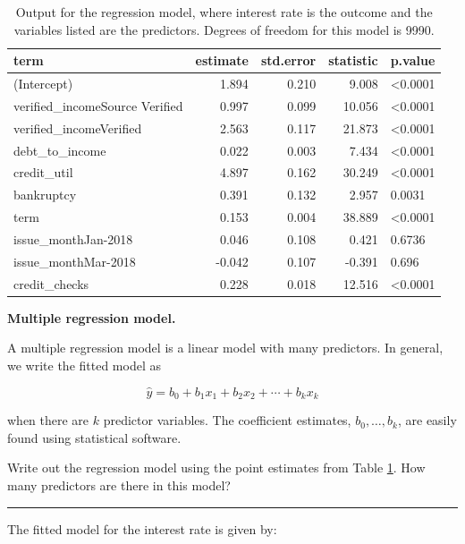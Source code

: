 \documentclass[
  10pt,
  openany]{book}
\theoremstyle{definition}
\theoremstyle{definition}
\theoremstyle{definition}
\theoremstyle{definition}
\theoremstyle{remark}
\begin{document}
\begin{table}
\centering
\caption{\label{tab:loansFullModelOutput}Output for the regression model, where interest rate is the outcome and the variables listed are the predictors. Degrees of freedom for this model is 9990.}
\centering
\begin{tabular}[t]{l|r|r|r|l}
\hline
term & estimate & std.error & statistic & p.value\\
\hline
(Intercept) & 1.894 & 0.210 & 9.008 & <0.0001\\
\hline
verified\_incomeSource Verified & 0.997 & 0.099 & 10.056 & <0.0001\\
\hline
verified\_incomeVerified & 2.563 & 0.117 & 21.873 & <0.0001\\
\hline
debt\_to\_income & 0.022 & 0.003 & 7.434 & <0.0001\\
\hline
credit\_util & 4.897 & 0.162 & 30.249 & <0.0001\\
\hline
bankruptcy & 0.391 & 0.132 & 2.957 & 0.0031\\
\hline
term & 0.153 & 0.004 & 38.889 & <0.0001\\
\hline
issue\_monthJan-2018 & 0.046 & 0.108 & 0.421 & 0.6736\\
\hline
issue\_monthMar-2018 & -0.042 & 0.107 & -0.391 & 0.696\\
\hline
credit\_checks & 0.228 & 0.018 & 12.516 & <0.0001\\
\hline
\end{tabular}
\end{table}

\textbf{Multiple regression model.}

A multiple regression model is a linear model with many predictors. In general,
we write the fitted model as

\[\hat{y} = b_0 + b_1 x_1 + b_2 x_2 + \cdots + b_k x_k\]

when there are \(k\) predictor variables. The coefficient estimates, \(b_0,\ldots, b_k\),
are easily found using statistical software.

Write out the regression model using the point estimates from Table \ref{tab:loansFullModelOutput}.
How many predictors are there in this model?

\begin{center}\rule{0.5\linewidth}{0.5pt}\end{center}

The fitted model for the interest rate is given by:
\end{document}
